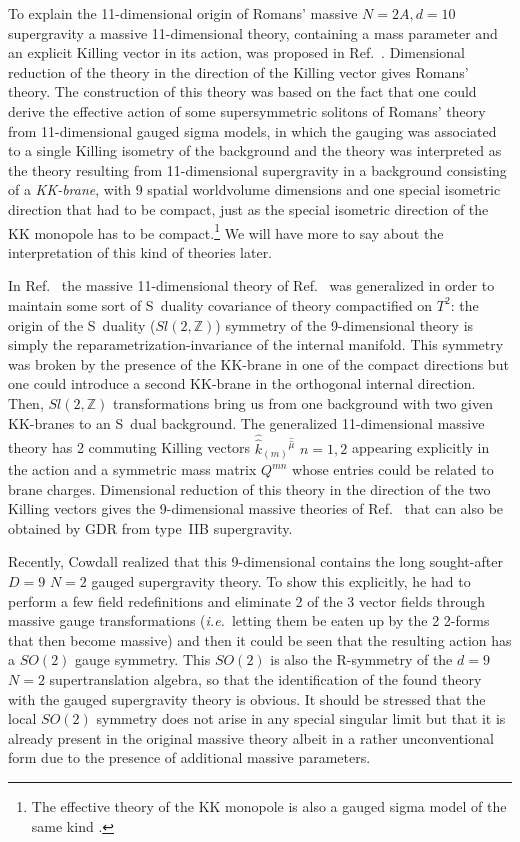 \documentclass[12pt,a4paper]{article}
\begin{document}
To explain the 11-dimensional origin of Romans' massive $N=2A,d=10$
supergravity a massive 11-dimensional theory, containing a mass
parameter and an explicit Killing vector in its action, was proposed
in Ref.~\cite{kn:BLO}.  Dimensional reduction of the theory in the
direction of the Killing vector gives Romans' theory.  The
construction of this theory was based on the fact that one could
derive the effective action of some supersymmetric solitons of Romans'
theory from 11-dimensional gauged sigma models, in which the gauging
was associated to a single Killing isometry of the background
\cite{kn:O} and the theory was interpreted as the theory resulting
from 11-dimensional supergravity in a background consisting of a {\it
  KK-brane}, with 9 spatial worldvolume dimensions and one special
isometric direction that had to be compact, just as the special
isometric direction of the KK monopole has to be compact.\footnote{The
  effective theory of the KK monopole is also a gauged sigma model of
  the same kind \cite{kn:BJO2}.}  We will have more to say about the
interpretation of this kind of theories later.

In Ref.~\cite{kn:MO} the massive 11-dimensional theory of
Ref.~\cite{kn:BLO} was generalized in order to maintain some sort of
S~duality covariance of theory compactified on $T^{2}$: the origin of
the S~duality ($Sl(2,\mathbb{Z})$) symmetry of the 9-dimensional
theory is simply the reparametrization-invariance of the internal
manifold. This symmetry was broken by the presence of the KK-brane in
one of the compact directions but one could introduce a second
KK-brane in the orthogonal internal direction. Then,
$Sl(2,\mathbb{Z})$ transformations bring us from one background with
two given KK-branes to an S~dual background.  The generalized
11-dimensional massive theory has 2 commuting Killing vectors
$\hat{\hat{k}}_{(m)}{}^{\hat{\hat{\mu}}}$ $n=1,2$ appearing explicitly
in the action and a symmetric mass matrix $Q^{mn}$ whose entries could
be related to brane charges. Dimensional reduction of this theory in
the direction of the two Killing vectors gives the 9-dimensional
massive theories of Ref.~\cite{kn:MO} that can also be obtained by GDR
from type~IIB supergravity.

Recently, Cowdall \cite{kn:cow} realized that this 9-dimensional
contains the long sought-after $D=9$ $N=2$ gauged supergravity theory.
To show this explicitly, he had to perform a few field redefinitions
and eliminate 2 of the 3 vector fields through massive gauge
transformations ({\em i.e.}~letting them be eaten up by the 2 2-forms
that then become massive) and then it could be seen that the resulting
action has a $SO(2)$ gauge symmetry.  This $SO(2)$ is also the
R-symmetry of the $d=9$ $N=2$ supertranslation algebra, so that the
identification of the found theory with the gauged supergravity theory
is obvious.  It should be stressed that the local $SO(2)$ symmetry
does not arise in any special singular limit but that it is already
present in the original massive theory albeit in a rather
unconventional form due to the presence of additional massive
parameters.
\end{document}
